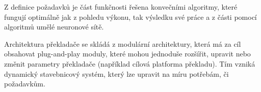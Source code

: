 
Z definice požadavků je část funkčnosti řešena konvečními algoritmy, které fungují optimálně jak z pohledu výkonu, tak výsledku své práce a z části pomocí algoritmů umělé neuronové sítě.


Architektura překladače se skládá z modulární architektury, která má za cíl obsahovat plug-and-play moduly, které mohou jednoduše rozšířit, upravit nebo změnit parametry překladače (například cílová platforma překladu). Tím vzniká dynamický stavebnicový systém, který lze upravit na míru potřebám, či požadavkům.



 
